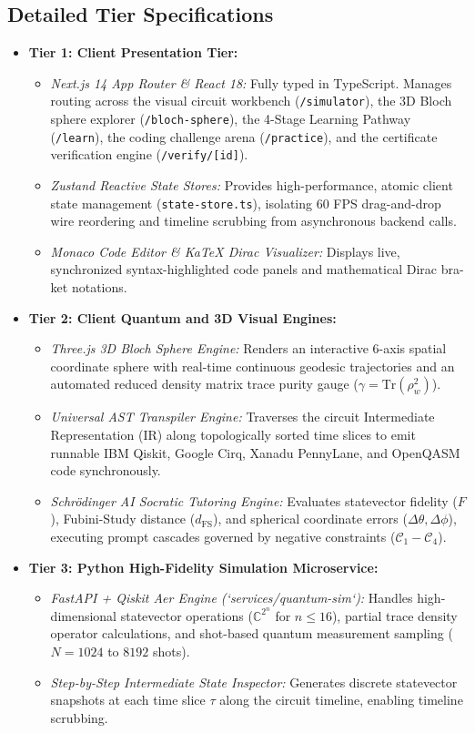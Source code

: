 \documentclass[11pt, a4paper]{article}
\begin{document}
\subsection{Detailed Tier Specifications}
\begin{itemize}
	\item \textbf{Tier 1: Client Presentation Tier:}
	\begin{itemize}
		\item \textit{Next.js 14 App Router \& React 18:} Fully typed in TypeScript. Manages routing across the visual circuit workbench (\texttt{/simulator}), the 3D Bloch sphere explorer (\texttt{/bloch-sphere}), the 4-Stage Learning Pathway (\texttt{/learn}), the coding challenge arena (\texttt{/practice}), and the certificate verification engine (\texttt{/verify/[id]}).
		\item \textit{Zustand Reactive State Stores:} Provides high-performance, atomic client state management (\texttt{state-store.ts}), isolating 60 FPS drag-and-drop wire reordering and timeline scrubbing from asynchronous backend calls.
		\item \textit{Monaco Code Editor \& KaTeX Dirac Visualizer:} Displays live, synchronized syntax-highlighted code panels and mathematical Dirac bra-ket notations.
	\end{itemize}

	\item \textbf{Tier 2: Client Quantum and 3D Visual Engines:}
	\begin{itemize}
		\item \textit{Three.js 3D Bloch Sphere Engine:} Renders an interactive 6-axis spatial coordinate sphere with real-time continuous geodesic trajectories and an automated reduced density matrix trace purity gauge ($\gamma = \text{Tr}(\rho_w^2)$).
		\item \textit{Universal AST Transpiler Engine:} Traverses the circuit Intermediate Representation (IR) along topologically sorted time slices to emit runnable IBM Qiskit, Google Cirq, Xanadu PennyLane, and OpenQASM code synchronously.
		\item \textit{Schr{\"o}dinger AI Socratic Tutoring Engine:} Evaluates statevector fidelity ($F$), Fubini-Study distance ($d_{\text{FS}}$), and spherical coordinate errors ($\Delta\theta, \Delta\phi$), executing prompt cascades governed by negative constraints ($\mathcal{C}_1-\mathcal{C}_4$).
	\end{itemize}

	\item \textbf{Tier 3: Python High-Fidelity Simulation Microservice:}
	\begin{itemize}
		\item \textit{FastAPI + Qiskit Aer Engine (`services/quantum-sim`):} Handles high-dimensional statevector operations ($\mathbb{C}^{2^n}$ for $n \le 16$), partial trace density operator calculations, and shot-based quantum measurement sampling ($N=1024$ to $8192$ shots).
		\item \textit{Step-by-Step Intermediate State Inspector:} Generates discrete statevector snapshots at each time slice $\tau$ along the circuit timeline, enabling timeline scrubbing.
	\end{itemize}


\end{itemize}
\end{document}
